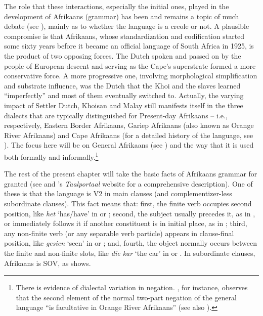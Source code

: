 \documentclass[output=paper,colorlinks,citecolor=brown]{langscibook}
\begin{document}
The role that these interactions, especially the initial ones, played in the development of Afrikaans (grammar) has been and remains a topic of much debate (see \citealt[249, 257--258]{AuweraOlmen2017}), mainly as to whether the language is a creole or not. A plausible compromise is that Afrikaans, whose standardization and codification started some sixty years before it became an official language of South Africa in 1925, is the product of two opposing forces. The Dutch spoken and passed on by the people of European descent and serving as the Cape’s superstrate formed a more conservative force. A more progressive one, involving morphological simplification and substrate influence, was the Dutch that the Khoi and the slaves learned “imperfectly” and most of them eventually switched to. Actually, the varying impact of Settler Dutch, Khoisan and Malay still manifests itself in the three dialects that are typically distinguished for Present-day Afrikaans – i.e., respectively, Eastern Border Afrikaans, Gariep Afrikaans (also known as Orange River Afrikaans) and Cape Afrikaans (for a detailed history of the language, see \citealt{Rensburg2012}). The focus here will be on General Afrikaans (see \citealt{Huyssteen2020}) and the way that it is used both formally and informally.\footnote{There is evidence of dialectal variation in negation. \citet[165]{Roberge2000}, for instance, observes that the second element of the normal two-part negation of the general language “is facultative in Orange River Afrikaans” (see also \citealt{Stell2009}).}

The rest of the present chapter will take the basic facts of Afrikaans grammar for granted (see \citealt{Donaldson1993} and \citeauthor{LandsbergenEtAl2014}'s \citeyear{LandsbergenEtAl2014}  \textit{Taalportaal} website for a comprehensive description). One of these is that the language is V2 in main clauses (and complementizer-less subordinate clauses). This fact means that: first, the finite verb occupies second position, like \textit{het} ‘has/have’ in  or ; second, the subject usually precedes it, as in , or immediately follows it if another constituent is in initial place, as in ; third, any non-finite verb (or any separable verb particle) appears in clause-final position, like \textit{gesien} ‘seen’ in  or ; and, fourth, the object normally occurs between the finite and non-finite slots, like \textit{die kar} ‘the car’ in  or . In subordinate clauses, Afrikaans is SOV, as  shows.
\end{document}
